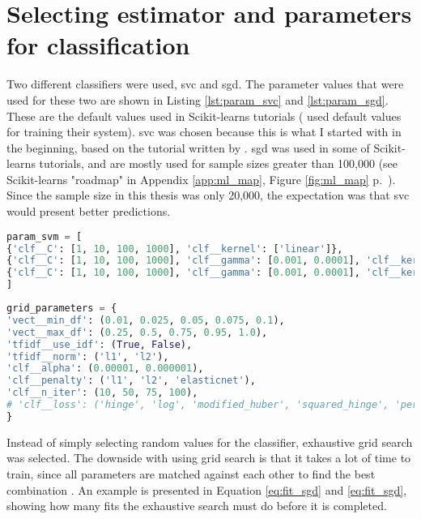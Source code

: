 \section{Selecting estimator and parameters for classification}
\label{sec:estimator_parameter_selection}
Two different classifiers were used, \gls{svc} and \gls{sgd}.
The parameter values that were used for these two are shown in Listing \ref{lst:param_svc} and  \ref{lst:param_sgd}.
These are the default values used in Scikit-learns tutorials \cite{Scikitlearn.org2016k, Scikitlearn.org2016l} (\cite{Huang2008, Maas2011, Zhang2003} used default values for training their system).
\gls{svc} was chosen because this is what I started with in the beginning, based on the tutorial written by \cite{Rehurek2014}.
\gls{sgd} was used in some of Scikit-learns tutorials, and are mostly used for sample sizes greater than 100,000 (see Scikit-learns "roadmap" in Appendix \ref{app:ml_map}, Figure \ref{fig:ml_map}  
 p.~\pageref{app:ml_map}).
Since the sample size in this thesis was only 20,000, the expectation was that \gls{svc} would present better predictions.
\begin{lstlisting}[caption={Parameters for SVC}, label={lst:param_svc}, language={Python}] 
param_svm = [
{'clf__C': [1, 10, 100, 1000], 'clf__kernel': ['linear']},
{'clf__C': [1, 10, 100, 1000], 'clf__gamma': [0.001, 0.0001], 'clf__kernel': ['rbf']},
{'clf__C': [1, 10, 100, 1000], 'clf__gamma': [0.001, 0.0001], 'clf__kernel': ['sigmoid']},
]
\end{lstlisting}
\begin{lstlisting}[caption={Parameters for SGD}, label={lst:param_sgd}, language={Python}] 
grid_parameters = {
'vect__min_df': (0.01, 0.025, 0.05, 0.075, 0.1),
'vect__max_df': (0.25, 0.5, 0.75, 0.95, 1.0),
'tfidf__use_idf': (True, False),
'tfidf__norm': ('l1', 'l2'),
'clf__alpha': (0.00001, 0.000001),
'clf__penalty': ('l1', 'l2', 'elasticnet'),
'clf__n_iter': (10, 50, 75, 100),
# 'clf__loss': ('hinge', 'log', 'modified_huber', 'squared_hinge', 'perceptron'),
}
\end{lstlisting}
Instead of simply selecting random values for the classifier, exhaustive grid search was selected. 
The downside with using grid search is that it takes a lot of time to train, since all parameters are matched against each other to find the best combination \cite{Bishop2006, Markham2015a}.
An example is presented in Equation \ref{eq:fit_sgd} and \ref{eq:fit_sgd}, showing how many fits the exhaustive search must do before it is completed.
